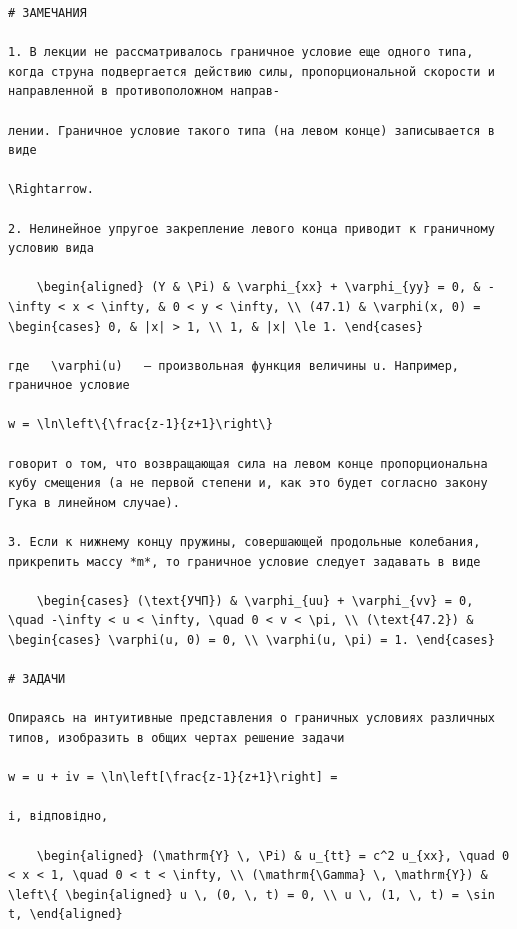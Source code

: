 \documentclass[
  ukrainian,
]{article}
\begin{document}
\begin{verbatim}
# ЗАМЕЧАНИЯ

1. В лекции не рассматривалось граничное условие еще одного типа, когда струна подвергается действию силы, пропорциональной скорости и направленной в противоположном направ-

лении. Граничное условие такого типа (на левом конце) записывается в виде

\Rightarrow.

2. Нелинейное упругое закрепление левого конца приводит к граничному условию вида

    \begin{aligned} (Y & \Pi) & \varphi_{xx} + \varphi_{yy} = 0, & -\infty < x < \infty, & 0 < y < \infty, \\ (47.1) & \varphi(x, 0) = \begin{cases} 0, & |x| > 1, \\ 1, & |x| \le 1. \end{cases}

где   \varphi(u)   — произвольная функция величины u. Например, граничное условие

w = \ln\left\{\frac{z-1}{z+1}\right\}

говорит о том, что возвращающая сила на левом конце пропорциональна кубу смещения (а не первой степени и, как это будет согласно закону Гука в линейном случае).

3. Если к нижнему концу пружины, совершающей продольные колебания, прикрепить массу *m*, то граничное условие следует задавать в виде

    \begin{cases} (\text{УЧП}) & \varphi_{uu} + \varphi_{vv} = 0, \quad -\infty < u < \infty, \quad 0 < v < \pi, \\ (\text{47.2}) & \begin{cases} \varphi(u, 0) = 0, \\ \varphi(u, \pi) = 1. \end{cases}

# ЗАДАЧИ

Опираясь на интуитивные представления о граничных условиях различных типов, изобразить в общих чертах решение задачи

w = u + iv = \ln\left[\frac{z-1}{z+1}\right] =

і, відповідно,

    \begin{aligned} (\mathrm{Y} \, \Pi) & u_{tt} = c^2 u_{xx}, \quad 0 < x < 1, \quad 0 < t < \infty, \\ (\mathrm{\Gamma} \, \mathrm{Y}) & \left\{ \begin{aligned} u \, (0, \, t) = 0, \\ u \, (1, \, t) = \sin t, \end{aligned}


\end{verbatim}
\end{document}
